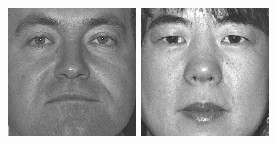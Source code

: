 \begin{figure}[ht]
\begin{center}
  \includegraphics[width=\columnwidth/10]{ch5/figures/feret19.jpg}
  \includegraphics[width=\columnwidth/10]{ch5/figures/feret20.jpg}

\end{center}
\end{figure}
